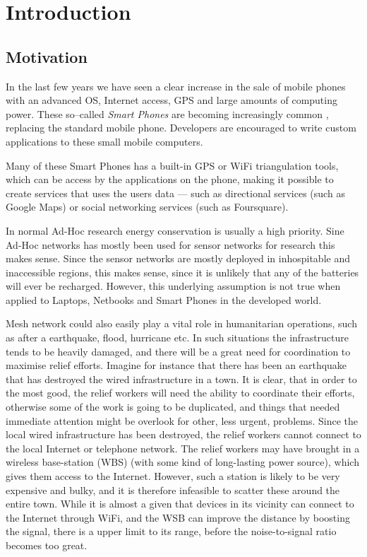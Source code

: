 \section{Introduction}
\label{section:introduction} 

\subsection{Motivation}
In the last few years we have seen a clear increase in the sale of mobile phones with an advanced OS, Internet access, GPS and large amounts of computing power. These so--called \emph{Smart Phones} are becoming increasingly common , replacing the standard mobile phone. Developers are encouraged to write custom applications to these small mobile computers.
 
Many of these Smart Phones has a built-in GPS or WiFi triangulation tools, which can be access by the applications on the phone, making it possible to create services that uses the users data --- such as directional services (such as Google Maps) or social networking services (such as Foursquare).

In normal Ad-Hoc research energy conservation is usually a high priority. Sine Ad-Hoc networks has mostly been used for sensor networks for research this makes sense. Since the sensor networks are mostly deployed in inhospitable and inaccessible regions, this makes sense, since it is unlikely that any of the batteries will ever be recharged. However, this underlying assumption is not true when applied to Laptops, Netbooks and Smart Phones in the developed world. 

Mesh network could also easily play a vital role in humanitarian operations, such as after a earthquake, flood, hurricane etc. In such situations the infrastructure tends to be heavily damaged, and there will be a great need for coordination to maximise relief efforts. Imagine for instance that there has been an earthquake that has destroyed the wired infrastructure in a town. It is clear, that in order to the most good, the relief workers will need the ability to coordinate their efforts, otherwise some of the work is going to be duplicated, and things that needed immediate attention might be overlook for other, less urgent, problems. Since the local wired infrastructure has been destroyed, the relief workers cannot connect to the local Internet or telephone network. The relief workers may have brought in a wireless base-station (WBS) (with some kind of long-lasting power source), which gives them access to the Internet. However, such a station is likely to be very expensive and bulky, and it is therefore infeasible to scatter these around the entire town. While it is almost a given that devices in its vicinity can connect to the Internet through WiFi, and the WSB can improve the distance by boosting the signal, there is a upper limit to its range, before the noise-to-signal ratio becomes too great. 

